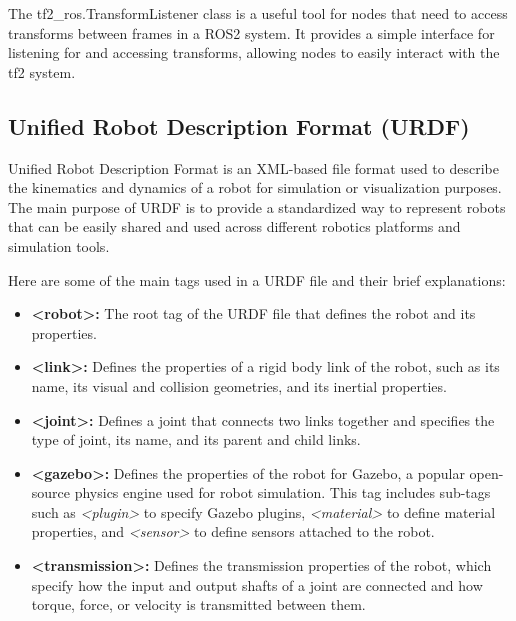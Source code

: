 \documentclass[12pt,oneside]{article}
\begin{document}
The tf2\_ros.TransformListener class is a useful tool for nodes that need to access transforms between frames in a ROS2 system. It provides a simple interface for listening for and accessing transforms, allowing nodes to easily interact with the tf2 system.

\subsection{Unified Robot Description Format (URDF)}\label{urdf}
Unified Robot Description Format is an XML-based file format used to describe the kinematics and dynamics of a robot for simulation or visualization purposes. The main purpose of URDF is to provide a standardized way to represent robots that can be easily shared and used across different robotics platforms and simulation tools.

Here are some of the main tags used in a URDF file and their brief explanations:
\begin{itemize}
\item \textbf{<robot>:} The root tag of the URDF file that defines the robot and its properties.
\item \textbf{<link>:} Defines the properties of a rigid body link of the robot, such as its name, its visual and collision geometries, and its inertial properties.
\item \textbf{<joint>:} Defines a joint that connects two links together and specifies the type of joint, its name, and its parent and child links.
\item \textbf{<gazebo>:} Defines the properties of the robot for Gazebo, a popular open-source physics engine used for robot simulation. This tag includes sub-tags such as \textit{<plugin>} to specify Gazebo plugins, \textit{<material>} to define material properties, and \textit{<sensor>} to define sensors attached to the robot.
\item \textbf{<transmission>:} Defines the transmission properties of the robot, which specify how the input and output shafts of a joint are connected and how torque, force, or velocity is transmitted between them.
\end{itemize}
\end{document}

